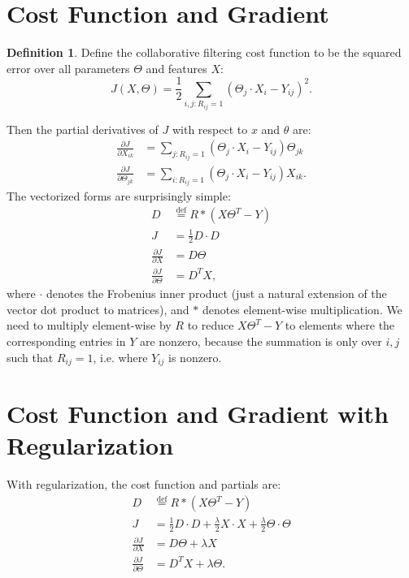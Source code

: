 \documentclass[12pt]{article}
\theoremstyle{plain}
\theoremstyle{definition}
\newtheorem{definition}[theorem]{Definition}
\theoremstyle{remark}
\newcommand{\defeq}{\overset{\mathrm{def}}{=}}
\begin{document}
\section{Cost Function and Gradient}

\begin{definition}
Define the collaborative filtering cost function to be the squared error over all parameters $\Theta$ and features $X$:
$$J(X, \Theta) = \frac{1}{2} \sum_{i,j:R_{ij}=1} (\Theta_j \cdot X_i - Y_{ij})^2.$$ 
\end{definition}

Then the partial derivatives of $J$ with respect to $x$ and $\theta$ are: 
\begin{align*}
\frac{\partial J}{\partial X_{ik}} &= \sum_{j:R_{ij}=1} (\Theta_j \cdot X_i - Y_{ij}) \Theta_{jk} \\
\frac{\partial J}{\partial \Theta_{jk}} &= \sum_{i:R_{ij}=1} (\Theta_j \cdot X_i - Y_{ij}) X_{ik}.
\end{align*}
The vectorized forms are surprisingly simple:
\begin{align*}
D &\defeq R * (X \Theta^T - Y) \\
J &= \frac{1}{2}D \cdot D \\
\frac{\partial J}{\partial X} &= D \Theta \\
\frac{\partial J}{\partial \Theta} &= D^T X,
\end{align*}
where $\cdot$ denotes the Frobenius inner product (just a natural extension of the vector dot product to matrices), and $*$ denotes element-wise multiplication. We need to multiply element-wise by $R$ to reduce $X\Theta^T - Y$ to elements where the corresponding entries in $Y$ are nonzero, because the summation is only over $i,j$ such that $R_{ij} = 1$, i.e. where $Y_{ij}$ is nonzero.

\section{Cost Function and Gradient with Regularization}

With regularization, the cost function and partials are: 
\begin{align*}
D &\defeq R * (X \Theta^T - Y) \\
J &= \frac{1}{2}D \cdot D + \frac{\lambda}{2} X \cdot X + \frac{\lambda}{2} \Theta \cdot \Theta \\
\frac{\partial J}{\partial X} &= D \Theta + \lambda X \\
\frac{\partial J}{\partial \Theta} &= D^T X + \lambda \Theta.
\end{align*}
\end{document}

